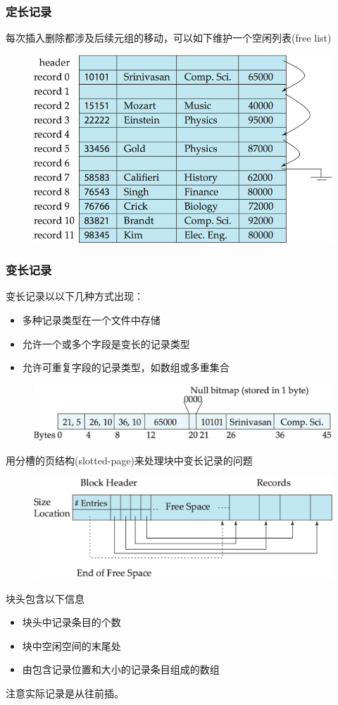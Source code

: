 \subsubsection{定长记录}
每次插入删除都涉及后续元组的移动，可以如下维护一个空闲列表(free list)
\begin{figure}[H]
\centering
\includegraphics[width=0.6\linewidth]{fig/free_lists.png}
\end{figure}

\subsubsection{变长记录}
变长记录以以下几种方式出现：
\begin{itemize}
	\item 多种记录类型在一个文件中存储
	\item 允许一个或多个字段是变长的记录类型
	\item 允许可重复字段的记录类型，如数组或多重集合
\end{itemize}
\begin{figure}[H]
\centering
\includegraphics[width=0.5\linewidth]{fig/variable-length.png}
\end{figure}

用分槽的页结构(slotted-page)来处理块中变长记录的问题
\begin{figure}[H]
\centering
\includegraphics[width=0.5\linewidth]{fig/slotted_page.png}
\end{figure}

块头包含以下信息
\begin{itemize}
	\item 块头中记录条目的个数
	\item 块中空闲空间的末尾处
	\item 由包含记录位置和大小的记录条目组成的数组
\end{itemize}
注意实际记录是从往前插。

